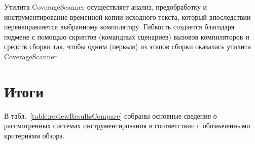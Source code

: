 Утилита CoverageScanner осуществляет анализ, предобработку и инструментирование временной копии исходного текста, который впоследствии перенаправляется выбранному компилятору. Гибкость создается благодаря подмене с помощью скриптов (командных сценариев) вызовов компиляторов и средств сборки так, чтобы одним (первым) из этапов сборки оказалась утилита CoverageScanner \cite{reviewFrog}.

\section{Итоги}

В табл.~\ref{table:reviewResultsCompare} собраны основные сведения о рассмотренных системах инструментирования в соответствии с обозначенными критериями обзора.
\begin{table}[htbp]
  \centering
  \captionsetup{skip=5pt}
  \caption{Основные характеристики систем инструментирования.}
\end{table}

